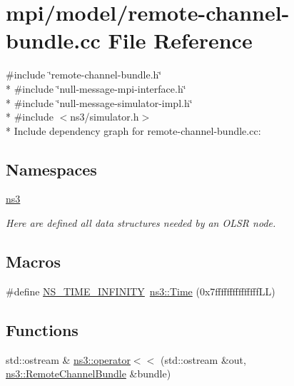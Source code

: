 \hypertarget{remote-channel-bundle_8cc}{}\section{mpi/model/remote-\/channel-\/bundle.cc File Reference}
\label{remote-channel-bundle_8cc}
{\ttfamily \#include \char`\"{}remote-\/channel-\/bundle.\+h\char`\"{}}\\*
{\ttfamily \#include \char`\"{}null-\/message-\/mpi-\/interface.\+h\char`\"{}}\\*
{\ttfamily \#include \char`\"{}null-\/message-\/simulator-\/impl.\+h\char`\"{}}\\*
{\ttfamily \#include $<$ns3/simulator.\+h$>$}\\*
Include dependency graph for remote-\/channel-\/bundle.cc\+:
\subsection*{Namespaces}
\begin{DoxyCompactItemize}
\item 
 \hyperlink{namespacens3}{ns3}
\begin{DoxyCompactList}\small\item\em Here are defined all data structures needed by an O\+L\+SR node. \end{DoxyCompactList}\end{DoxyCompactItemize}
\subsection*{Macros}
\begin{DoxyCompactItemize}
\item 
\#define \hyperlink{remote-channel-bundle_8cc_a50057d8e9722233eead8cac53b0cede8}{N\+S\+\_\+\+T\+I\+M\+E\+\_\+\+I\+N\+F\+I\+N\+I\+TY}~\hyperlink{classns3_1_1Time}{ns3\+::\+Time} (0x7fffffffffffffff\+L\+L)
\end{DoxyCompactItemize}
\subsection*{Functions}
\begin{DoxyCompactItemize}
\item 
std\+::ostream \& \hyperlink{namespacens3_a0c38a5a2bbcca7359b5585262cf377c3}{ns3\+::operator$<$$<$} (std\+::ostream \&out, \hyperlink{classns3_1_1RemoteChannelBundle}{ns3\+::\+Remote\+Channel\+Bundle} \&bundle)
\end{DoxyCompactItemize}


